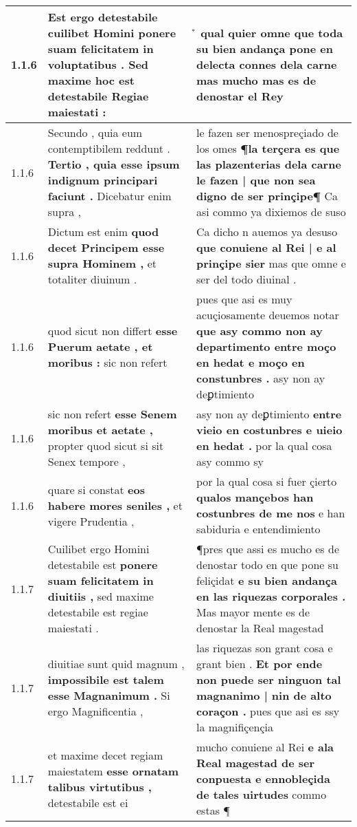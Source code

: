 \begin{tabular}{|p{1cm}|p{6.5cm}|p{6.5cm}|}
1.1.6 & Est ergo detestabile cuilibet Homini \textbf{ ponere suam felicitatem in voluptatibus . } Sed maxime hoc est detestabile Regiae maiestati : & ̉ qual quier omne \textbf{ que toda su bien andança pone en delecta connes dela carne } mas mucho mas es de denostar el Rey \\\hline
1.1.6 & Secundo , quia eum contemptibilem reddunt . \textbf{ Tertio , quia esse ipsum indignum principari faciunt . } Dicebatur enim supra , & le fazen ser menospreçiado de los omes \textbf{ ¶la terçera es que las plazenterias dela carne le fazen | que non sea digno de ser prinçipe¶ } Ca asi commo ya dixiemos de suso \\\hline
1.1.6 & Dictum est enim \textbf{ quod decet Principem esse supra Hominem , } et totaliter diuinum . & Ca dicho n auemos ya desuso \textbf{ que conuiene al Rei | e al prinçipe sier } mas que omne e ser del todo diuinal . \\\hline
1.1.6 & quod sicut non differt \textbf{ esse Puerum aetate , et moribus : } sic non refert & pues que asi es muy acuçiosamente deuemos notar \textbf{ que asy commo non ay departimento entre moço en hedat e moço en constunbres . } asy non ay deꝑtimiento \\\hline
1.1.6 & sic non refert \textbf{ esse Senem moribus et aetate , } propter quod sicut si sit Senex tempore , & asy non ay deꝑtimiento \textbf{ entre vieio en costunbres e uieio en hedat . } por la qual cosa asy commo sy \\\hline
1.1.6 & quare si constat \textbf{ eos habere mores seniles , } et vigere Prudentia , & por la qual cosa si fuer çierto \textbf{ qualos mançebos han costunbres de me nos } e han sabiduria e entendimiento \\\hline
1.1.7 & Cuilibet ergo Homini detestabile est \textbf{ ponere suam felicitatem in diuitiis , } sed maxime detestabile est regiae maiestati . & ¶pres que assi es mucho es de denostar todo en que pone su feliçidat \textbf{ e su bien andança en las riquezas corporales . } Mas mayor mente es de denostar la Real magestad \\\hline
1.1.7 & diuitiae sunt quid magnum , \textbf{ impossibile est talem esse Magnanimum . } Si ergo Magnificentia , & las riquezas son grant cosa e grant bien . \textbf{ Et por ende non puede ser ninguon tal magnanimo | nin de alto coraçon . } pues que asi es ssy la magnifiçençia \\\hline
1.1.7 & et maxime decet regiam maiestatem \textbf{ esse ornatam talibus virtutibus , } detestabile est ei & mucho conuiene al Rei \textbf{ e ala Real magestad de ser conpuesta e ennobleçida de tales uirtudes } commo estas ¶ \\\hline

\end{tabular}
